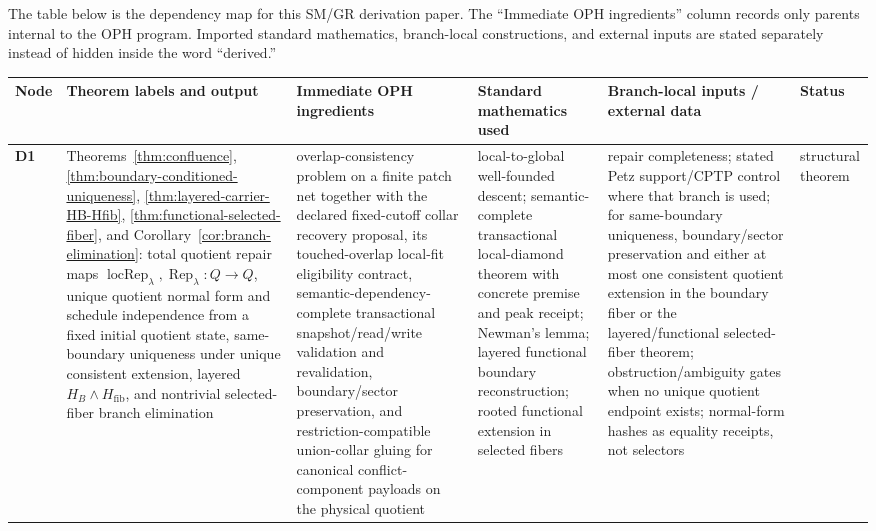 \documentclass[11pt]{article}
\begin{document}
The table below is the dependency map for this SM/GR derivation paper. The ``Immediate OPH ingredients'' column records only parents internal to the OPH program. Imported standard mathematics, branch-local constructions, and external inputs are stated separately instead of hidden inside the word ``derived.''

\begingroup
\scriptsize
\setlength{\tabcolsep}{1pt}
\begin{longtable}{@{}>{\raggedright\arraybackslash}p{}>{\raggedright\arraybackslash}p{}>{\raggedright\arraybackslash}p{}>{\raggedright\arraybackslash}p{}>{\raggedright\arraybackslash}p{}>{\raggedright\arraybackslash}p{}@{}}
\toprule
Node & Theorem labels and output & Immediate OPH ingredients & Standard mathematics used & Branch-local inputs / external data & Status \\
\midrule
\endhead
\bottomrule
\endfoot
\textbf{D1} & Theorems~\ref{thm:confluence}, \ref{thm:boundary-conditioned-uniqueness}, \ref{thm:layered-carrier-HB-Hfib}, \ref{thm:functional-selected-fiber}, and Corollary~\ref{cor:branch-elimination}: total quotient repair maps \(\operatorname{locRep}_\lambda,\operatorname{Rep}_\lambda:Q\to Q\), unique quotient normal form and schedule independence from a fixed initial quotient state, same-boundary uniqueness under unique consistent extension, layered \(H_B\wedge H_{\mathrm{fib}}\), and nontrivial selected-fiber branch elimination & overlap-consistency problem on a finite patch net together with the declared fixed-cutoff collar recovery proposal, its touched-overlap local-fit eligibility contract, semantic-dependency-complete transactional snapshot/read/write validation and revalidation, boundary/sector preservation, and restriction-compatible union-collar gluing for canonical conflict-component payloads on the physical quotient & local-to-global well-founded descent; semantic-complete transactional local-diamond theorem with concrete premise and peak receipt; Newman's lemma; layered functional boundary reconstruction; rooted functional extension in selected fibers & repair completeness; stated Petz support/CPTP control where that branch is used; for same-boundary uniqueness, boundary/sector preservation and either at most one consistent quotient extension in the boundary fiber or the layered/functional selected-fiber theorem; obstruction/ambiguity gates when no unique quotient endpoint exists; normal-form hashes as equality receipts, not selectors & structural theorem \\

\end{longtable}
\end{document}
